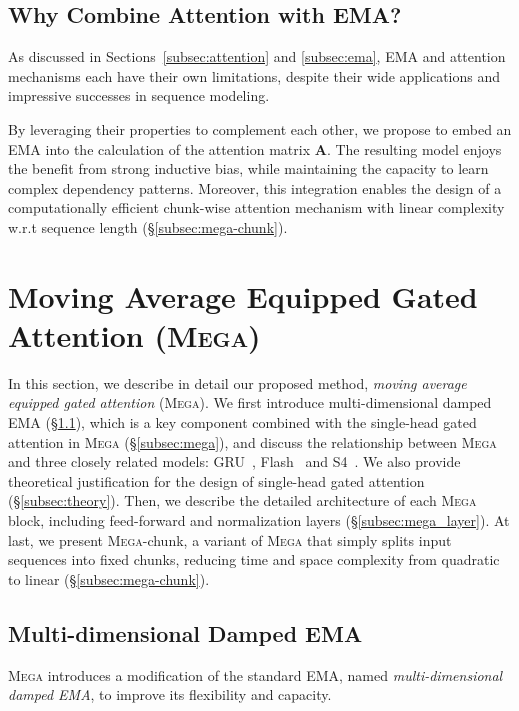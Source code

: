 \subsection{Why Combine Attention with EMA?}
\label{subsec:problem}

As discussed in Sections~\ref{subsec:attention} and \ref{subsec:ema}, EMA and attention mechanisms each have their own limitations, despite their wide applications and impressive successes in sequence modeling.

By leveraging their properties to complement each other, we propose to embed an EMA into the calculation of the attention matrix $\boldsymbol{A}$. The resulting model enjoys the benefit from strong inductive bias, while maintaining the capacity to learn complex dependency patterns. Moreover, this integration enables the design of a computationally efficient chunk-wise attention mechanism with linear complexity w.r.t sequence length (\S\ref{subsec:mega-chunk}).

\section{Moving Average Equipped Gated Attention (\textsc{Mega})}
\label{sec:mega}
In this section, we describe in detail our proposed method, \emph{moving average equipped gated attention} (\textsc{Mega}).
We first introduce multi-dimensional damped EMA (\S\ref{subsec:mddema}), which is a key component combined with the single-head gated attention in \textsc{Mega} (\S\ref{subsec:mega}), and discuss the relationship between \textsc{Mega} and three closely related models: GRU~\citep{cho2014properties}, Flash~\citep{hua2022transformer} and S4~\citep{gu2022efficiently}. We also provide theoretical justification for the design of single-head gated attention  (\S\ref{subsec:theory}).
Then, we describe the detailed architecture of each \textsc{Mega} block, including feed-forward and normalization layers (\S\ref{subsec:mega_layer}). 
At last, we present \textsc{Mega}-chunk, a variant of \textsc{Mega} that simply splits input sequences into fixed chunks, reducing time and space complexity from quadratic to linear (\S\ref{subsec:mega-chunk}).

\subsection{Multi-dimensional Damped EMA}
\label{subsec:mddema}
\textsc{Mega} introduces a modification of the standard EMA, named \emph{multi-dimensional damped EMA}, to improve its flexibility and capacity.

